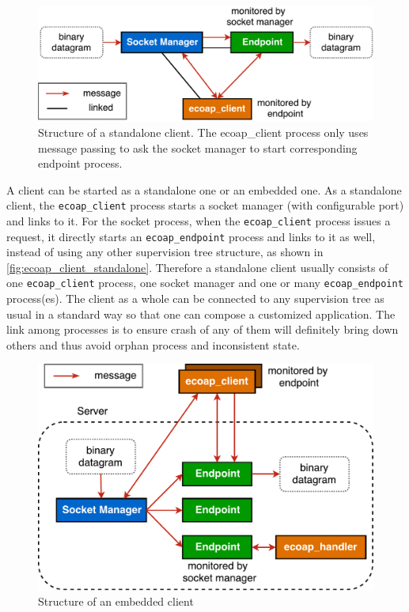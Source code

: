 \begin{figure}[!htbp]
\centering
\includegraphics[scale = 0.55]{ecoap_client_standalone}
\caption[Structure of a standalone client]{Structure of a standalone client. The ecoap\_client process only uses message passing to ask the socket manager to start corresponding endpoint process.}
\label{fig:ecoap_client_standalone}
\end{figure}

A client can be started as a standalone one or an embedded one. As a standalone client, the \verb|ecoap_client| process starts a socket manager (with configurable port) and links to it. For the socket process, when the \verb|ecoap_client| process issues a request, it directly starts an \verb|ecoap_endpoint| process and links to it as well, instead of using any other supervision tree structure, as shown in \autoref{fig:ecoap_client_standalone}. Therefore a standalone client usually consists of one \verb|ecoap_client| process, one socket manager and one or many \verb|ecoap_endpoint| process(es). The client as a whole can be connected to any supervision tree as usual in a standard way so that one can compose a customized application. The link among processes is to ensure crash of any of them will definitely bring down others and thus avoid orphan process and inconsistent state. 

\begin{figure}[!htbp]
\centering
\includegraphics[scale = 0.55]{ecoap_client_embedded}
\caption{Structure of an embedded client}
\label{fig:ecoap_client_embedded}
\end{figure}


